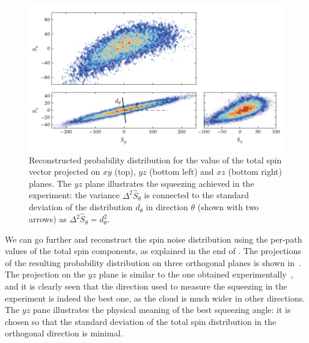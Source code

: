\begin{figure}
    \centerline{\includegraphics{figures_generated/bec_squeezing/riedel_cloud.pdf}}

    \caption{
    Reconstructed probability distribution for the value of the total spin vector projected on $xy$ (top), $yz$ (bottom left) and $xz$ (bottom right) planes.
    The $yz$ plane illustrates the squeezing achieved in the experiment: the variance $\Delta^2 \hat{S}_\theta$ is connected to the standard deviation of the distribution $d_\theta$ in direction $\theta$ (shown with two arrows) as $\Delta^2 \hat{S}_\theta = d_\theta^2$.}
    \label{fig:bec-squeezing:separation:cloud}
\end{figure}

We can go further and reconstruct the spin noise distribution using the per-path values of the total spin components, as explained in the end of .
The projections of the resulting probability distribution on three orthogonal planes is shown in~.
The projection on the $yz$ plane is similar to the one obtained experimentally~\cite{Riedel2010}, and it is clearly seen that the direction used to measure the squeezing in the experiment is indeed the best one, as the cloud is much wider in other directions.
The $yz$ pane illustrates the physical meaning of the best squeezing angle: it is chosen so that the standard deviation of the total spin distribution in the orthogonal direction is minimal.
